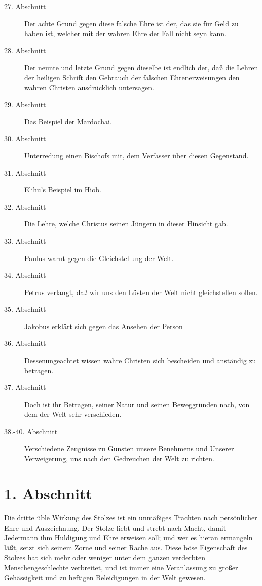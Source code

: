 \begin{description}
\item[27. Abschnitt] Der achte Grund gegen diese falsche Ehre ist der, das sie für Geld zu haben ist, welcher mit der wahren Ehre der Fall nicht seyn kann.
\item[28. Abschnitt] Der neunte und letzte Grund gegen dieselbe ist endlich der, daß die Lehren der heiligen Schrift den Gebrauch der falschen Ehrenerweisungen den wahren Christen ausdrücklich untersagen.
\item[29. Abschnitt] Das Beispiel der Mardochai.
\item[30. Abschnitt] Unterredung einen Bischofs mit, dem Verfasser über diesen Gegenstand.
\item[31. Abschnitt] Elihu's Beispiel im Hiob.
\item[32. Abschnitt] Die Lehre, welche Christus seinen Jüngern in dieser Hinsicht gab.
\item[33. Abschnitt] Paulus warnt gegen die Gleichstellung der Welt.
\item[34. Abschnitt] Petrus verlangt, daß wir uns den Lüsten der Welt nicht gleichstellen sollen.
\item[35. Abschnitt] Jakobus erklärt sich gegen das Ansehen der Person
\item[36. Abschnitt] Dessenungeachtet wissen wahre Christen sich bescheiden und anständig zu betragen.
\item[37. Abschnitt] Doch ist ihr Betragen, seiner Natur und seinen Beweggründen nach, von dem der Welt sehr verschieden.
\item[38.-40. Abschnitt] Verschiedene Zeugnisse zu Gunsten unsere Benehmens und Unserer Verweigerung, uns nach den Gedreuchen der Welt zu richten.

\end{description}
\normalsize

\section{1. Abschnitt}

Die dritte üble Wirkung des Stolzes ist ein unmäßiges Trachten nach persönlicher Ehre und Auszeichnung. Der Stolze liebt und strebt nach Macht, damit Jedermann ihm Huldigung und Ehre erweisen soll; und wer es hieran ermangeln läßt, setzt sich seinem Zorne und seiner Rache aus. Diese böse Eigenschaft des Stolzes hat sich mehr oder weniger unter dem ganzen verderbten Menschengeschlechte verbreitet, und ist immer eine Veranlassung zu großer Gehässigkeit und zu heftigen Beleidigungen in der Welt gewesen.


